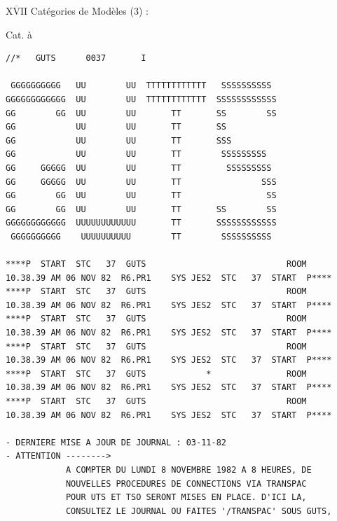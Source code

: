 \uline{$\overline{\mathrm{XVII}}$} Catégories de Modèles (3) :

Cat. à  

{\tiny
\begin{verbatim}
//*   GUTS      0037       I

 GGGGGGGGGG   UU        UU  TTTTTTTTTTTT   SSSSSSSSSS
GGGGGGGGGGGG  UU        UU  TTTTTTTTTTTT  SSSSSSSSSSSS
GG        GG  UU        UU       TT       SS        SS
GG            UU        UU       TT       SS
GG            UU        UU       TT       SSS
GG            UU        UU       TT        SSSSSSSSS
GG     GGGGG  UU        UU       TT         SSSSSSSSS
GG     GGGGG  UU        UU       TT                SSS
GG        GG  UU        UU       TT                 SS
GG        GG  UU        UU       TT       SS        SS
GGGGGGGGGGGG  UUUUUUUUUUUU       TT       SSSSSSSSSSSS
 GGGGGGGGGG    UUUUUUUUUU        TT        SSSSSSSSSS

****P  START  STC   37  GUTS                            ROOM       10.38.39 AM 06 NOV 82  R6.PR1    SYS JES2  STC   37  START  P****
****P  START  STC   37  GUTS                            ROOM       10.38.39 AM 06 NOV 82  R6.PR1    SYS JES2  STC   37  START  P****
****P  START  STC   37  GUTS                            ROOM       10.38.39 AM 06 NOV 82  R6.PR1    SYS JES2  STC   37  START  P****
****P  START  STC   37  GUTS                            ROOM       10.38.39 AM 06 NOV 82  R6.PR1    SYS JES2  STC   37  START  P****
****P  START  STC   37  GUTS            *               ROOM       10.38.39 AM 06 NOV 82  R6.PR1    SYS JES2  STC   37  START  P****
****P  START  STC   37  GUTS                            ROOM       10.38.39 AM 06 NOV 82  R6.PR1    SYS JES2  STC   37  START  P****

- DERNIERE MISE A JOUR DE JOURNAL : 03-11-82
- ATTENTION -------->
            A COMPTER DU LUNDI 8 NOVEMBRE 1982 A 8 HEURES, DE
            NOUVELLES PROCEDURES DE CONNECTIONS VIA TRANSPAC
            POUR UTS ET TSO SERONT MISES EN PLACE. D'ICI LA,
            CONSULTEZ LE JOURNAL OU FAITES '/TRANSPAC' SOUS GUTS,
\end{verbatim}
}


